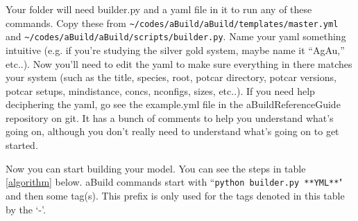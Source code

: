 \documentclass{article}
\begin{document}
Your folder will need builder.py and a yaml file in it to run any of
these commands. Copy these from 
\verb|~/codes/aBuild/aBuild/templates/master.yml| and
\verb|~/codes/aBuild/aBuild/scripts/builder.py|. Name your yaml
something intuitive (e.g. if you're studying the silver gold system,
maybe name it ``AgAu,'' etc..). Now you'll need to edit the yaml to
make sure everything in there matches your system (such as the title,
species, root, potcar directory, potcar versions, potcar setups,
mindistance, concs, nconfigs, sizes, etc..). If you need help
deciphering the yaml, go see the example.yml file in the
aBuildReferenceGuide repository on git. It has a bunch of comments to
help you understand what's going on, although you don't really need to
understand what's going on to get started. 

Now you can start building your model. You can see the steps in table
\ref{algorithm} below. aBuild commands start with
``\verb|python builder.py **YML**|" and then some tag(s). This prefix
is only used for the tags denoted in this table by the `-'.  
\end{document}
